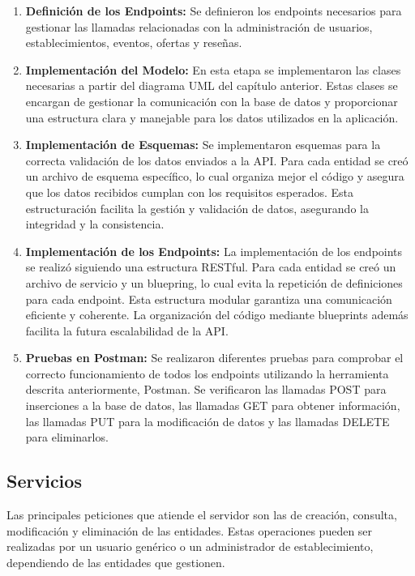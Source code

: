 \begin{enumerate}
    \item \textbf{Definición de los Endpoints: }Se definieron los endpoints necesarios para gestionar las llamadas relacionadas con la administración de usuarios, establecimientos, eventos, ofertas y reseñas.

    \item \textbf{Implementación del Modelo: } En esta etapa se implementaron las clases necesarias a partir del diagrama UML del capítulo anterior. Estas clases se encargan de gestionar la comunicación con la base de datos y proporcionar una estructura clara y manejable para los datos utilizados en la aplicación.

    \item \textbf{Implementación de Esquemas: } Se implementaron esquemas para la correcta validación de los datos enviados a la API. Para cada entidad se creó un archivo de esquema específico, lo cual organiza mejor el código y asegura que los datos recibidos cumplan con los requisitos esperados. Esta estructuración facilita la gestión y validación de datos, asegurando la integridad y la consistencia.

    \item \textbf{Implementación de los Endpoints: } La implementación de los endpoints se realizó siguiendo una estructura RESTful. Para cada entidad se creó un archivo de servicio y un bluepring, lo cual evita la repetición de definiciones para cada endpoint. Esta estructura modular garantiza una comunicación eficiente y coherente. La organización del código mediante blueprints además facilita la futura escalabilidad de la API.

    \item \textbf{Pruebas en Postman: } Se realizaron diferentes pruebas para comprobar el correcto funcionamiento de todos los endpoints utilizando la herramienta descrita anteriormente, Postman. Se verificaron las llamadas POST para inserciones a la base de datos, las llamadas GET para obtener información, las llamadas PUT para la modificación de datos y las llamadas DELETE para eliminarlos.
\end{enumerate}

\subsection{Servicios}

Las principales peticiones que atiende el servidor son las de creación, consulta, modificación y eliminación de las entidades. Estas operaciones pueden ser realizadas por un usuario genérico o un administrador de establecimiento, dependiendo de las entidades que gestionen.

